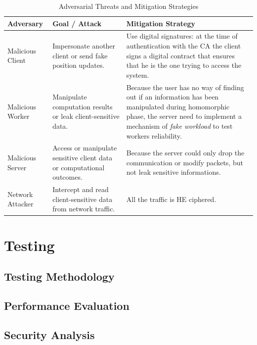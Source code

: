 \documentclass[12pt,a4paper,twoside]{book}
\begin{document}
\begin{table}[h]
\renewcommand{\arraystretch}{1.3}
\small
\begin{tabularx}{\linewidth}{|l|X|X|}
\hline
\textbf{Adversary} & \textbf{Goal / Attack} & \textbf{Mitigation Strategy} \\ \hline

Malicious Client &
Impersonate another client or send fake position updates. &
Use digital signatures: at the time of authentication with the CA the client signs a digital contract that ensures that he is the one trying to access the system. \\ \hline

Malicious Worker &
Manipulate computation results or leak client-sensitive data. &
Because the user has no way of finding out if an information has been manipulated during homomorphic phase, the server need to implement a mechanism of \emph{fake workload} to test workers reliability. \\ \hline

Malicious Server &
Access or manipulate sensitive client data or computational outcomes. &
Because the server could only drop the communication or modify packets, but not leak sensitive informations. \\ \hline

Network Attacker &
Intercept and read client-sensitive data from network traffic. &
All the traffic is HE ciphered. \\ \hline

\end{tabularx}
\caption{Adversarial Threats and Mitigation Strategies}
\label{table:adversaries}
\end{table}


\chapter{Testing}
\section{Testing Methodology}

\section{Performance Evaluation}

\section{Security Analysis}
\end{document}
